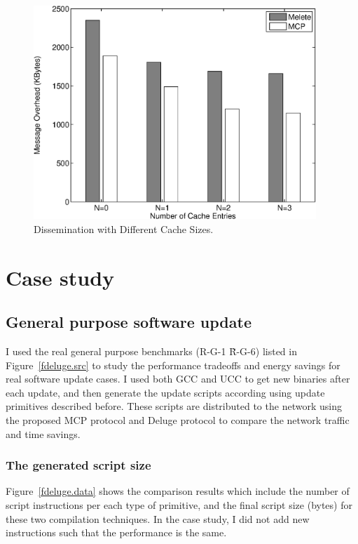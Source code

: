 \begin{figure}[htbp]
\centering
\includegraphics[width=4.2in]{figures/fcache.eps}
\caption{Dissemination with Different Cache Sizes.}
\label{fcache}
\vspace{-0.2in}
\end{figure}


\section{Case study}


\subsection{General purpose software update}
I used the real general purpose benchmarks (R-G-1 \~ R-G-6)
listed in Figure~\ref{fdeluge.src} to study the performance tradeoffs and
energy savings for real software update cases.
I used both GCC and UCC to get new binaries after each update, and then generate the update scripts according using update primitives described before. These scripts are distributed to the network using
the proposed MCP protocol and Deluge protocol to compare the network traffic and time savings.

\subsubsection{The generated script size}
Figure~\ref{fdeluge.data} shows the comparison results which include the number of script instructions per each type of primitive, and the final script size (bytes) for these two compilation techniques. In the case study, I did not add new instructions such that the performance is the same.

